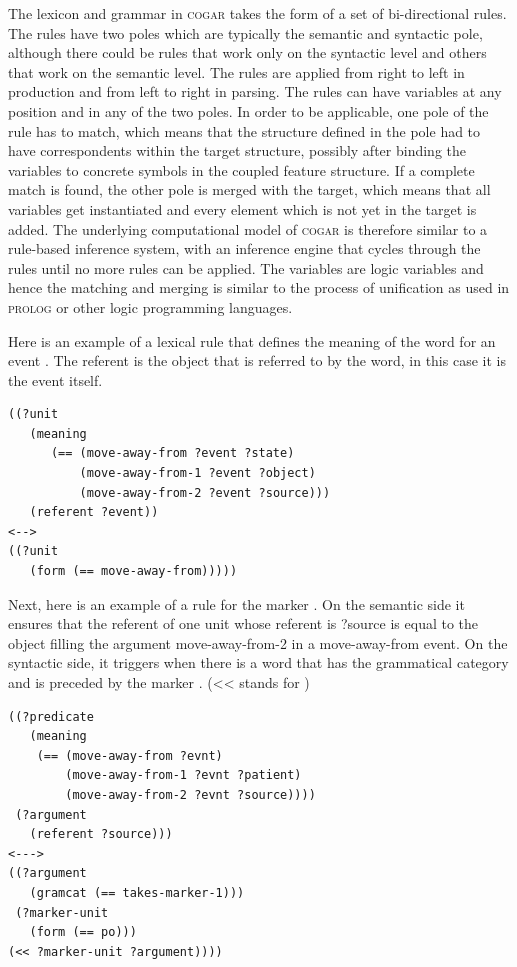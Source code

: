 The lexicon and grammar in \textsc{cogar} takes the form of a set of bi-directional rules. The rules have two poles 
which are typically the semantic and syntactic pole, although there could be rules that work only on the 
syntactic level and others that work on the semantic level. The rules are applied 
from right to left in production and from left to right in parsing. 
The rules can have variables at any position and in any of the two poles. In order to be applicable, 
one pole of the rule has to match, which means that the structure defined in the pole had to 
have correspondents within the target structure, possibly after binding the variables to concrete 
symbols in the coupled feature structure. If a complete match is 
found, the other pole is merged with the target, which means that all variables get instantiated and every 
element which is not yet in the target is added. The underlying computational model of \textsc{cogar}  
is therefore similar to a rule-based inference system, with an inference engine that cycles through the rules until 
no more rules can be applied. The variables are logic variables and hence the matching and merging is similar 
to the process of unification as used in \textsc{prolog} or other logic programming languages. 

Here is an example of a lexical rule that defines the meaning of the word for an event . The referent is 
the object that is referred to by the word, in this case it is the event itself. 
\clearpage
\begin{verbatim}
((?unit 
   (meaning
      (== (move-away-from ?event ?state)
          (move-away-from-1 ?event ?object)
          (move-away-from-2 ?event ?source)))
   (referent ?event)) 
<-->
((?unit
   (form (== move-away-from)))))
\end{verbatim}
Next, here is an example of a rule for the marker . On the semantic side it ensures that the referent of one unit 
whose referent is ?source is equal to the object filling the argument move-away-from-2 in a move-away-from event. 
On the syntactic side, it triggers when there is a word that has the grammatical category  and 
is preceded by the marker . (<< stands for ) 
\begin{verbatim}
((?predicate 
   (meaning
    (== (move-away-from ?evnt)
        (move-away-from-1 ?evnt ?patient)
        (move-away-from-2 ?evnt ?source))))
 (?argument
   (referent ?source))) 
<---> 
((?argument
   (gramcat (== takes-marker-1)))
 (?marker-unit
   (form (== po))) 
(<< ?marker-unit ?argument))))
\end{verbatim}

